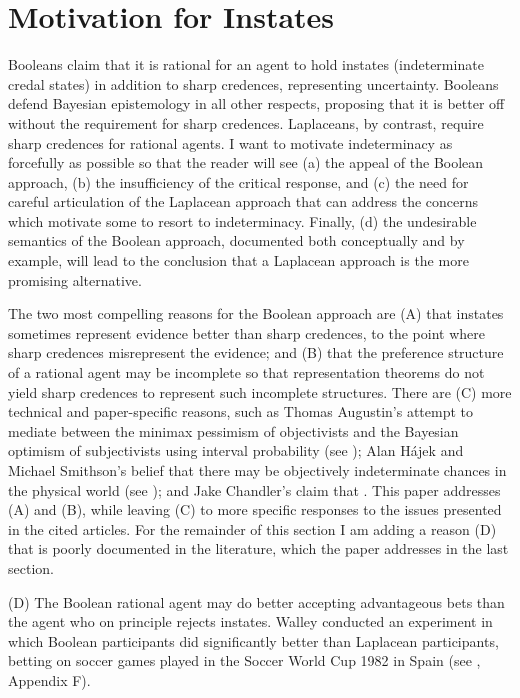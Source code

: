 \documentclass[11pt]{article}
\begin{document}
\section{Motivation for Instates}
\label{MotivationForIndeterminateCredalStates}

Booleans claim that it is rational for an agent to hold instates
(indeterminate credal states) in addition to sharp credences,
representing uncertainty. Booleans defend Bayesian epistemology in all
other respects, proposing that it is better off without the
requirement for sharp credences. Laplaceans, by contrast, require
sharp credences for rational agents. I want to motivate indeterminacy
as forcefully as possible so that the reader will see (a) the appeal
of the Boolean approach, (b) the insufficiency of the critical
response, and (c) the need for careful articulation of the Laplacean
approach that can address the concerns which motivate some to resort
to indeterminacy. Finally, (d) the undesirable semantics of the
Boolean approach, documented both conceptually and by example, will
lead to the conclusion that a Laplacean approach is the more promising
alternative. 

The two most compelling reasons for the Boolean approach are (A) that
instates sometimes represent evidence better than sharp credences, to
the point where sharp credences misrepresent the evidence; and (B)
that the preference structure of a rational agent may be incomplete so
that representation theorems do not yield sharp credences to represent
such incomplete structures. There are (C) more technical and
paper-specific reasons, such as Thomas Augustin's attempt to mediate
between the minimax pessimism of objectivists and the Bayesian
optimism of subjectivists using interval probability (see
); Alan H{\'a}jek and Michael Smithson's
belief that there may be objectively indeterminate chances in the
physical world (see ); and Jake
Chandler's claim that 
.  This paper addresses (A) and (B), while
leaving (C) to more specific responses to the issues presented in the
cited articles. For the remainder of this section I am adding a reason
(D) that is poorly documented in the literature, which the paper
addresses in the last section.

(D) The Boolean rational agent may do better accepting advantageous
bets than the agent who on principle rejects instates. Walley
conducted an experiment in which Boolean participants did
significantly better than Laplacean participants, betting on soccer
games played in the Soccer World Cup 1982 in Spain (see
, Appendix F).
\end{document}
